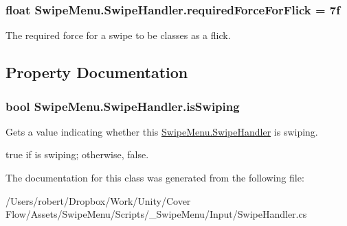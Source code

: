 \subsubsection[{required\+Force\+For\+Flick}]{\setlength{\rightskip}{0pt plus 5cm}float Swipe\+Menu.\+Swipe\+Handler.\+required\+Force\+For\+Flick = 7f}\label{class_swipe_menu_1_1_swipe_handler_a94ba3d86d8da6741e1c01c135c72b54e}


The required force for a swipe to be classes as a flick. 



\subsection{Property Documentation}
\hypertarget{class_swipe_menu_1_1_swipe_handler_a659a32477642f780d13b8ec241542bdc}{}
\subsubsection[{is\+Swiping}]{\setlength{\rightskip}{0pt plus 5cm}bool Swipe\+Menu.\+Swipe\+Handler.\+is\+Swiping\hspace{0.3cm}{\ttfamily [get]}}\label{class_swipe_menu_1_1_swipe_handler_a659a32477642f780d13b8ec241542bdc}


Gets a value indicating whether this \hyperlink{class_swipe_menu_1_1_swipe_handler}{Swipe\+Menu.\+Swipe\+Handler} is swiping. 

{\ttfamily true} if is swiping; otherwise, {\ttfamily false}.

The documentation for this class was generated from the following file\+:\begin{DoxyCompactItemize}
\item 
/\+Users/robert/\+Dropbox/\+Work/\+Unity/\+Cover Flow/\+Assets/\+Swipe\+Menu/\+Scripts/\+\_\+\+Swipe\+Menu/\+Input/Swipe\+Handler.\+cs\end{DoxyCompactItemize}
